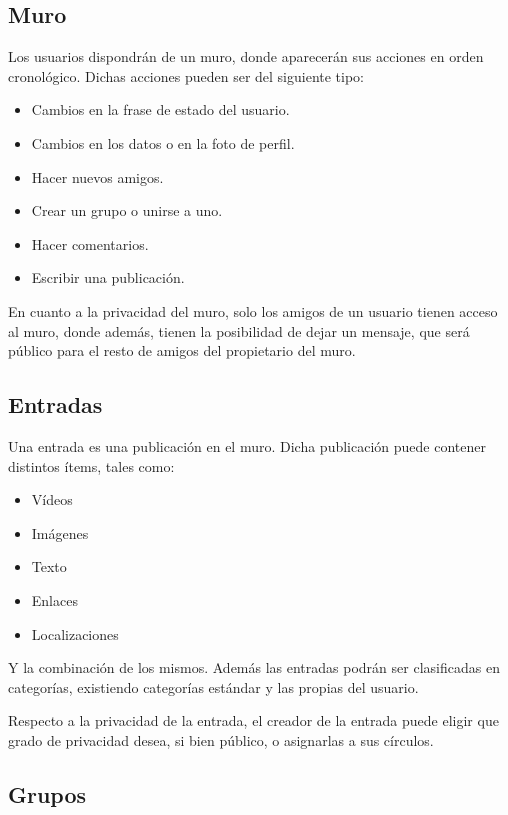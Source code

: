 \documentclass[12pt, a4paper, titlepage]{article}
\begin{document}
\subsection{Muro}\label{cap:Muro}

Los usuarios dispondrán de un muro, donde aparecerán sus acciones en orden cronológico. Dichas acciones pueden ser del siguiente tipo:

\begin{itemize}
\item Cambios en la frase de estado del usuario.
\item Cambios en los datos o en la foto de perfil.
\item Hacer nuevos amigos.
\item Crear un grupo o unirse a uno.
\item Hacer comentarios.
\item Escribir una publicación.
\end{itemize}

En cuanto a la privacidad del muro, solo los amigos de un usuario tienen acceso al muro, donde además, tienen la posibilidad de dejar un mensaje, que será público para el resto de amigos del propietario del muro. 

\subsection{Entradas}\label{cap:entradas}

Una entrada es una publicación en el muro. Dicha publicación puede contener distintos ítems, tales como:
\begin{itemize}
\item Vídeos
\item Imágenes
\item Texto
\item Enlaces
\item Localizaciones
\end{itemize}
Y la combinación de los mismos. Además las entradas podrán ser clasificadas en categorías, existiendo categorías estándar y las propias del usuario.

Respecto a la privacidad de la entrada, el creador de la entrada puede eligir que grado de privacidad desea, si bien público, o asignarlas a sus círculos.

\subsection{Grupos}
\end{document}
